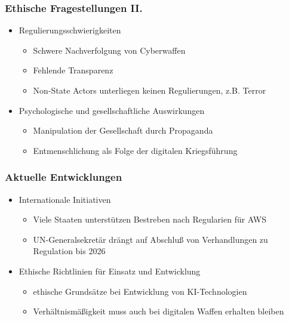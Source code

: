 \documentclass[handout]{beamer}
\begin{document}
\begin{frame}
    \frametitle{Ethische Fragestellungen II.}
    \begin{itemize}
        \item Regulierungsschwierigkeiten
        \begin{itemize}
            \item Schwere Nachverfolgung von Cyberwaffen
            \item Fehlende Transparenz \cite{dipert}
            \item Non-State Actors unterliegen keinen Regulierungen, z.B. Terror
        \end{itemize}
        \item Psychologische und gesellschaftliche Auswirkungen
        \begin{itemize}
            \item Manipulation der Gesellschaft durch Propaganda
            \item Entmenschlichung als Folge der digitalen Kriegsführung \cite{vaticannews}
        \end{itemize}  
    \end{itemize}
\end{frame}

\begin{frame}
    \frametitle{Aktuelle Entwicklungen}
    \begin{itemize}
        \item Internationale Initiativen
        \begin{itemize}
            \item Viele Staaten unterstützen Bestreben nach Regularien für AWS \cite{amnesty}
            \item UN-Generalsekretär drängt auf Abschluß von Verhandlungen zu Regulation bis 2026 \cite{amnesty}
        \end{itemize}
        \item Ethische Richtlinien für Einsatz und Entwicklung
        \begin{itemize}
            \item ethische Grundsätze bei Entwicklung von KI-Technologien \cite{vaticannews}
            \item Verhältnismäßigkeit muss auch bei digitalen Waffen erhalten bleiben \cite{dipert}
        \end{itemize}
    \end{itemize}    
     
\end{frame}

 
\begin{frame}[allowframebreaks]
    \printbibliography
\end{frame}
\end{document}
